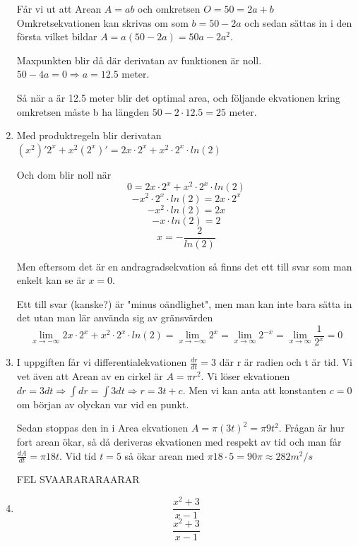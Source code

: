 \documentclass[a4paper,12pt]{article}
\begin{document}
\begin{enumerate}
    Får vi ut att Arean $A=ab$ och omkretsen $O=50=2a+b$
    Omkretsekvationen kan skrivas om som $b=50-2a$ och sedan 
    sättas in i den första vilket bildar $A=a(50-2a)=50a-2a^2$.

    Maxpunkten blir då där derivatan av funktionen är noll.
    $50-4a=0\Rightarrow a=12.5$ meter.

    Så när a är 12.5 meter blir det optimal area, och följande 
    ekvationen kring omkretsen måste b ha längden $50-2\cdot 12.5=25$ meter.

    \item 
    Med produktregeln blir derivatan
    $(x^2)'2^x+x^2(2^x)'=2x\cdot 2^x + x^2\cdot 2^x\cdot ln(2)$

    Och dom blir noll när 
    $$0=2x\cdot 2^x + x^2\cdot 2^x\cdot ln(2)$$
    $$-x^2\cdot 2^x\cdot ln(2)=2x\cdot 2^x $$
    $$-x^2\cdot ln(2)=2x$$
    $$-x\cdot ln(2)=2$$
    $$x=-\frac{2}{ln(2)}$$
    
    Men eftersom det är en andragradsekvation så finns det ett till 
    svar som man enkelt kan se är $x=0$.
    
    Ett till svar (kanske?) är "minus oändlighet", men man kan inte bara sätta
    in det utan man lär använda sig av gränsvärden
    $$\lim_{x\rightarrow -\infty}2x\cdot 2^x + x^2\cdot 2^x\cdot ln(2)
    =\lim_{x\rightarrow -\infty}2^{x}
    =\lim_{x\rightarrow \infty}2^{-x}
    =\lim_{x\rightarrow \infty}\frac{1}{2^x}
    =0$$

    \item I uppgiften får vi differentialekvationen $\frac{dr}{dt}=3$ 
    där r är radien och t är tid. Vi vet även att Arean av en cirkel är 
    $A=\pi r^2$. Vi löser ekvationen 
    $dr=3dt\Rightarrow \int dr =\int 3dt
    \Rightarrow r=3t+c$.
    Men vi kan anta att konstanten $c=0$ om början av olyckan var vid en punkt.
    
    Sedan stoppas den in i Area ekvationen $A=\pi (3t)^2=\pi 9t^2$. 
    Frågan är hur fort arean ökar, så då deriveras ekvationen med respekt av tid
    och man får $\frac{dA}{dt}=\pi 18t$. Vid tid $t=5$ så ökar arean med $\pi 18\cdot 5=90\pi \approx 282 m^2/s$
    
    FEL SVAARARARAARAR

    \item 
    $$\frac{x^2+3}{x-1}$$
    $$\frac{x^2+3}{x-1}$$

\end{enumerate}
\end{document}

